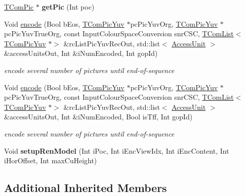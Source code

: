 \begin{DoxyCompactItemize}
\item 
\mbox{\label{class_t_enc_top_a3cd1bee0065ca46a6aad46dda2a64619}} 
\hyperlink{class_t_com_pic}{T\+Com\+Pic} $\ast$ {\bfseries get\+Pic} (Int poc)
\item 
Void \hyperlink{class_t_enc_top_a7ac847fd54e356d78c75a573f3624bd9}{encode} (Bool b\+Eos, \hyperlink{class_t_com_pic_yuv}{T\+Com\+Pic\+Yuv} $\ast$pc\+Pic\+Yuv\+Org, \hyperlink{class_t_com_pic_yuv}{T\+Com\+Pic\+Yuv} $\ast$pc\+Pic\+Yuv\+True\+Org, const Input\+Colour\+Space\+Conversion snr\+C\+SC, \hyperlink{class_t_com_list}{T\+Com\+List}$<$ \hyperlink{class_t_com_pic_yuv}{T\+Com\+Pic\+Yuv} $\ast$$>$ \&rc\+List\+Pic\+Yuv\+Rec\+Out, std\+::list$<$ \hyperlink{class_access_unit}{Access\+Unit} $>$ \&access\+Units\+Out, Int \&i\+Num\+Encoded, Int gop\+Id)
\begin{DoxyCompactList}\small\item\em encode several number of pictures until end-\/of-\/sequence \end{DoxyCompactList}\item 
\mbox{\label{class_t_enc_top_a99b466175091b2b2c945a0b4a620d413}} 
Void \hyperlink{class_t_enc_top_a99b466175091b2b2c945a0b4a620d413}{encode} (Bool b\+Eos, \hyperlink{class_t_com_pic_yuv}{T\+Com\+Pic\+Yuv} $\ast$pc\+Pic\+Yuv\+Org, \hyperlink{class_t_com_pic_yuv}{T\+Com\+Pic\+Yuv} $\ast$pc\+Pic\+Yuv\+True\+Org, const Input\+Colour\+Space\+Conversion snr\+C\+SC, \hyperlink{class_t_com_list}{T\+Com\+List}$<$ \hyperlink{class_t_com_pic_yuv}{T\+Com\+Pic\+Yuv} $\ast$$>$ \&rc\+List\+Pic\+Yuv\+Rec\+Out, std\+::list$<$ \hyperlink{class_access_unit}{Access\+Unit} $>$ \&access\+Units\+Out, Int \&i\+Num\+Encoded, Bool is\+Tff, Int gop\+Id)
\begin{DoxyCompactList}\small\item\em encode several number of pictures until end-\/of-\/sequence \end{DoxyCompactList}\item 
\mbox{\label{class_t_enc_top_a582d289d276a8e0900c56e345cce77e2}} 
Void {\bfseries setup\+Ren\+Model} (Int i\+Poc, Int i\+Enc\+View\+Idx, Int i\+Enc\+Content, Int i\+Hor\+Offset, Int max\+Cu\+Height)
\end{DoxyCompactItemize}
\subsection*{Additional Inherited Members}


